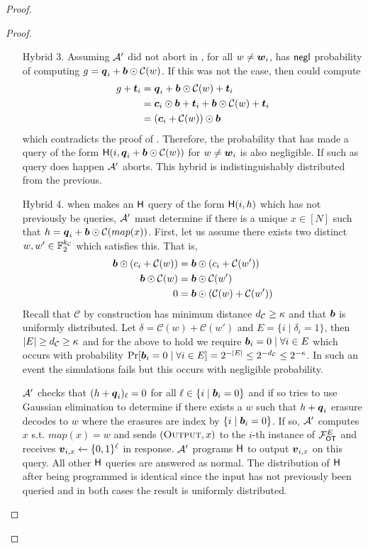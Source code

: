\begin{proof}
\begin{proof}
\begin{enumerate}[leftmargin=1.8cm]
			
			\item[Hybrid 3.]\label{hybrid:simOutput} Assuming $\mathcal{A}'$ did not abort in , for all $w\neq \boldsymbol{w}_i$, \Adv  has $\mathsf{negl}$ probability of computing $g=\boldsymbol{q}_i+\boldsymbol{b}\odot \mathcal{C}(w)$. If this was not the case, then \Adv  could compute
			\begin{align*}
			g +\boldsymbol{t}_i &=\boldsymbol{q}_i+\boldsymbol{b}\odot \mathcal{C}(w)+\boldsymbol{t}_i\\
			&=\boldsymbol{c}_i\odot\boldsymbol{b}+\boldsymbol{t}_i+\boldsymbol{b}\odot \mathcal{C}(w)+\boldsymbol{t}_i\\
			&=(\boldsymbol{c}_i+\mathcal{C}(w))\odot \boldsymbol{b}
			\end{align*}
			which contradicts the proof of .
			Therefore, the probability that \Adv has made a query of the form $\mathsf{H}(i,\boldsymbol{q}_i+\boldsymbol{b}\odot \mathcal{C}(w))$ for $w\neq \boldsymbol{w}_i$ is also negligible. If such as query does happen $\mathcal{A}'$ aborts. This hybrid is indistinguishably distributed from the previous. 
			
			
			\item[Hybrid 4.] \label{hybrid:simOutput2} when \send makes an $\mathsf{H}$ query of the form $\mathsf{H}(i,h)$ which has not previously be queries, $\mathcal{A}'$ must determine if there is a unique $x\in[N]$ such that $h=\boldsymbol{q}_i+\boldsymbol{b}\odot \mathcal{C}(map(x))$. First, let us assume there exists two distinct $w,w'\in\mathbb{F}^{{k_\mathcal{C}}}_2$ which satisfies this. That is,
			\begin{align*}
			\boldsymbol{b} \odot (c_i + \mathcal{C}(w)) &= \boldsymbol{b} \odot (c_i + \mathcal{C}(w'))\\
			\boldsymbol{b} \odot \mathcal{C}(w) &=			\boldsymbol{b} \odot \mathcal{C}(w') \\
			0 &= \boldsymbol{b} \odot (\mathcal{C}(w) + \mathcal{C}(w'))
			\end{align*}			
			Recall that $\mathcal{C}$ by construction has minimum distance ${d_\mathcal{C}}\geq\kappa$ and that $\boldsymbol{b}$ is uniformly distributed. Let $\delta=\mathcal{C}(w) + \mathcal{C}(w')$ and $E=\{i \mid \delta_i=1\}$, then $|E|\geq {d_\mathcal{C}}\geq \kappa$ and for the above to hold we require $\boldsymbol{b}_i=0 \mid \forall i\in E$ which occurs with probability $\Pr[\boldsymbol{b}_i=0 \mid \forall i\in E]=2^{-|E|}\leq 2^{-{d_\mathcal{C}}}\leq2^{-\kappa}$. In such an event the simulations fails but this occurs with negligible probability.			
			
			$\mathcal{A}'$ checks that $(h+\boldsymbol{q}_i)_\ell =0$ for all $\ell\in \{i \mid \boldsymbol{b}_i=0\}$ and if so tries to use Gaussian elimination to determine if there exists a $w$ such that $h+\boldsymbol{q}_i$ erasure decodes to $w$ where the erasures are index by $\{i \mid \boldsymbol{b}_i=0\}$. If so, $\mathcal{A}'$ computes $x$ s.t. $map(x)=w$ and sends $(\textsc{Output}, x)$ to the $i$-th instance of $\mathcal{F}_{\mathsf{OT}}^E$ and receives $\boldsymbol{v}_{i,x}\gets\{0,1\}^\ell$ in response. $\mathcal{A}'$ programs $\mathsf{H}$ to output $\boldsymbol{v}_{i,x}$ on this query. All other $\mathsf{H}$ queries are answered as normal. The distribution of $\mathsf{H}$ after being programmed is identical since the input has not previously been queried and in both cases the result is uniformly distributed.			
			

\end{enumerate}
\end{proof}
\end{proof}
